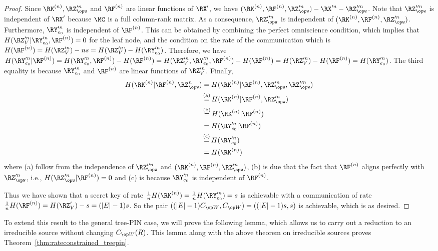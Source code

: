 \begin{proof}
Since $\RK^{(n)},\RZ'^n_{\opw}$ and $\RF^{(n)}$ are linear functions of $\RX'$, we have  $(\RK^{(n)}, \RF^{(n)}, \RZ'^n_{\opw}) - \RX'^n-\RZ''^n_{\opw}$. Note that $\RZ''^n_{\opw}$ is independent of $\RX'$ because $\MC$ is a full column-rank matrix. As a consequence, $\RZ''^n_{\opw}$ is independent of $(\RK^{(n)}, \RF^{(n)}, \RZ'^n_{\opw})$.  Furthermore, $\RY'^n_{e_0}$ is independent of $\RF^{(n)}$. This can be obtained by combining the perfect omniscience condition, which implies that $H(\RZ'^n_V|\RY'^n_{e_0},\RF^{(n)})=0$ for the leaf node, and the condition on the rate of the communication which is  $H(\RF^{(n)})=H(\RZ'^n_V)-ns=H(\RZ'^n_V)-H(\RY'^n_{e_0})$. Therefore, we have $H(\RY'^n_{e_0}|\RF^{(n)})= H(\RY'^n_{e_0},\RF^{(n)})-H(\RF^{(n)})=H(\RZ'^n_V,\RY'^n_{e_0},\RF^{(n)})-H(\RF^{(n)})=H(\RZ'^n_V)-H(\RF^{(n)})=H(\RY'^n_{e_0})$. The third equality is because $\RY'^n_{e_0}$ and $\RF^{(n)}$ are linear functions of $\RZ'^n_V$. Finally,
\begin{align*}
    H(\RK^{(n)}| \RF^{(n)}, \RZ^n_{\opw}) &=  H(\RK^{(n)}| \RF^{(n)}, \RZ'^n_{\opw},\RZ''^n_{\opw})\\
    &\utag{a}{=}  H(\RK^{(n)}| \RF^{(n)}, \RZ'^n_{\opw})\\
    &\utag{b}{=} H(\RK^{(n)}| \RF^{(n)})\\
    &= H(\RY'^n_{e_0}| \RF^{(n)})\\
    &\utag{c}{=}H(\RY'^n_{e_0})\\
    &= H(\RK^{(n)})
\end{align*}
where (a) follow from the independence of $\RZ''^n_{\opw}$ and $(\RK^{(n)}, \RF^{(n)}, \RZ'^n_{\opw})$, (b) is due that the fact that $\RF^{(n)}$ aligns perfectly with $\RZ'^n_{\opw}$, i.e., $H(\RZ'^n_{\opw}|\RF^{(n)})=0$ and (c) is because $\RY'^n_{e_0}$ is independent of $\RF^{(n)}$.

Thus we have shown that a secret key of rate $\frac{1}{n}H(\RK^{(n)})=\frac{1}{n}H(\RY'^n_{e_0})=s$ is achievable with a communication of rate $\frac{1}{n}H(\RF^{(n)})=H(\RZ'_V)-s= (|E|-1)s$. So the pair $((|E|-1)\wskc,\wskc)= ((|E|-1)s,s)$  is achievable, which is as desired.
\end{proof}

To extend this result to the general tree-PIN case, we will prove the following lemma, which allows us to carry out a reduction to an irreducible source without changing $\wskc(R)$. This lemma along with the above theorem on irreducible sources proves Theorem~\ref{thm:rateconstrained_treepin}. 

